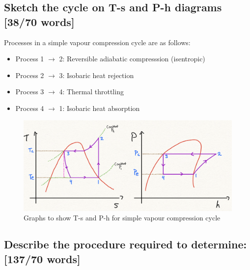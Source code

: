 \documentclass[12pt]{article}
\numberwithin{equation}{section}
\begin{document}
\begin{flushleft}
\subsection[T-s P-h Diagrams.]{Sketch the cycle on T-s and P-h diagrams [38/70 words]}
Processes in a simple vapour compression cycle are as follows:
\begin{itemize}
  \item Process 1 $\rightarrow$ 2: Reversible adiabatic compresssion (isentropic)
  \item Process 2 $\rightarrow$ 3: Isobaric heat rejection
  \item Process 3 $\rightarrow$ 4: Thermal throttling
  \item Process 4 $\rightarrow$ 1: Isobaric heat absorption
\end{itemize}
\begin{figure}[H]
  \centering
  \includegraphics[width  = \textwidth]{./img/TsPhDiagrams64.png}
  \caption{Graphs to show T-s and P-h for simple vapour compression cycle}
\end{figure}
\subsection{Describe the procedure required to determine: [137/70 words]}

\end{flushleft}
\end{document}
